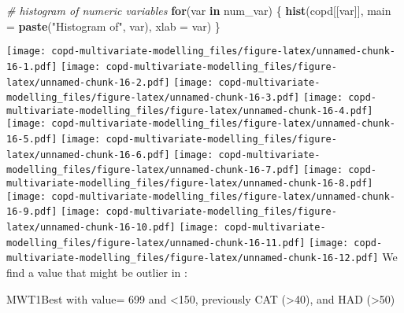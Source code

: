 \documentclass[
]{article}
\newenvironment{Shaded}{\begin{snugshade}}{\end{snugshade}}
\newcommand{\AttributeTok}[1]{\textcolor[rgb]{0.13,0.29,0.53}{#1}}
\newcommand{\CommentTok}[1]{\textcolor[rgb]{0.56,0.35,0.01}{\textit{#1}}}
\newcommand{\ConstantTok}[1]{\textcolor[rgb]{0.56,0.35,0.01}{#1}}
\newcommand{\ControlFlowTok}[1]{\textcolor[rgb]{0.13,0.29,0.53}{\textbf{#1}}}
\newcommand{\DecValTok}[1]{\textcolor[rgb]{0.00,0.00,0.81}{#1}}
\newcommand{\FunctionTok}[1]{\textcolor[rgb]{0.13,0.29,0.53}{\textbf{#1}}}
\newcommand{\NormalTok}[1]{#1}
\newcommand{\OtherTok}[1]{\textcolor[rgb]{0.56,0.35,0.01}{#1}}
\newcommand{\SpecialCharTok}[1]{\textcolor[rgb]{0.81,0.36,0.00}{\textbf{#1}}}
\newcommand{\StringTok}[1]{\textcolor[rgb]{0.31,0.60,0.02}{#1}}
\begin{document}
\begin{Shaded}
\begin{Highlighting}[]
\CommentTok{\# histogram of numeric variables}
\ControlFlowTok{for}\NormalTok{(var }\ControlFlowTok{in}\NormalTok{ num\_var) \{}
  \FunctionTok{hist}\NormalTok{(copd[[var]], }\AttributeTok{main =} \FunctionTok{paste}\NormalTok{(}\StringTok{"Histogram of"}\NormalTok{, var), }\AttributeTok{xlab =}\NormalTok{ var)}
\NormalTok{\}}
\end{Highlighting}
\end{Shaded}

\texttt{[image: copd-multivariate-modelling\_files/figure-latex/unnamed-chunk-16-1.pdf]}
\texttt{[image: copd-multivariate-modelling\_files/figure-latex/unnamed-chunk-16-2.pdf]}
\texttt{[image: copd-multivariate-modelling\_files/figure-latex/unnamed-chunk-16-3.pdf]}
\texttt{[image: copd-multivariate-modelling\_files/figure-latex/unnamed-chunk-16-4.pdf]}
\texttt{[image: copd-multivariate-modelling\_files/figure-latex/unnamed-chunk-16-5.pdf]}
\texttt{[image: copd-multivariate-modelling\_files/figure-latex/unnamed-chunk-16-6.pdf]}
\texttt{[image: copd-multivariate-modelling\_files/figure-latex/unnamed-chunk-16-7.pdf]}
\texttt{[image: copd-multivariate-modelling\_files/figure-latex/unnamed-chunk-16-8.pdf]}
\texttt{[image: copd-multivariate-modelling\_files/figure-latex/unnamed-chunk-16-9.pdf]}
\texttt{[image: copd-multivariate-modelling\_files/figure-latex/unnamed-chunk-16-10.pdf]}
\texttt{[image: copd-multivariate-modelling\_files/figure-latex/unnamed-chunk-16-11.pdf]}
\texttt{[image: copd-multivariate-modelling\_files/figure-latex/unnamed-chunk-16-12.pdf]}
We find a value that might be outlier in :

MWT1Best with value= 699 and \textless150, previously CAT
(\textgreater40), and HAD (\textgreater50)

\begin{Shaded}
\end{Shaded}

\begin{Shaded}
\end{Shaded}
\end{document}
